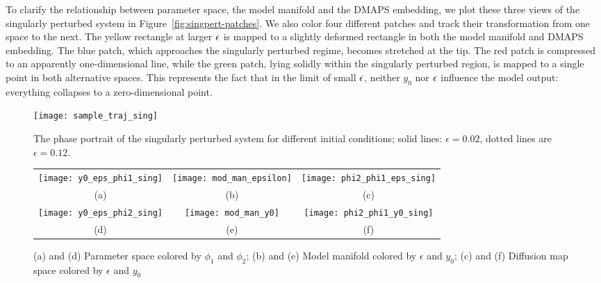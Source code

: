 To clarify the relationship between parameter space, the model
manifold and the DMAPS embedding, we plot these three views of the
singularly perturbed system in Figure~\ref{fig:singpert-patches}. We
also color four different patches and track their transformation from
one space to the next. The yellow rectangle at larger $\epsilon$ is mapped
to a slightly deformed rectangle in both the model manifold and DMAPS
embedding. The blue patch, which approaches the singularly perturbed
regime, becomes stretched at the tip. The red patch is compressed to
an apparently one-dimensional line, while the green patch, lying
solidly within the singularly perturbed region, is mapped to a single
point in both alternative spaces. This represents the fact that in the
limit of small $\epsilon$, neither $y_0$ nor $\epsilon$ influence the model
output: everything collapses to a zero-dimensional point.

\vspace{1cm}
\begin{figure}[!htp]
  \centering
  \texttt{[image: sample\_traj\_sing]}
  \caption[Phase portrait for singularly perturbed system]{The phase portrait of the singularly perturbed system for
    different initial conditions; solid lines: $\epsilon=0.02$, dotted
    lines are $\epsilon=0.12$. \label{fig:singpert}}
\end{figure}

\begin{figure}[!htp]
  \centering
  \begin{tabular}{ccc}
    \texttt{[image: y0\_eps\_phi1\_sing]} &
                                                               \texttt{[image: mod\_man\_epsilon]} &
                                                                                                                         \texttt{[image: phi2\_phi1\_eps\_sing]} \\
    (a) & (b) & (c)\\
    \texttt{[image: y0\_eps\_phi2\_sing]} &
                                                               \texttt{[image: mod\_man\_y0]} &
                                                                                                                    \texttt{[image: phi2\_phi1\_y0\_sing]}  \\
    (d) & (e) & (f)\\
  \end{tabular}
  \caption[DMAPS results for singularly perturbed system]{(a) and (d) Parameter space colored by $\phi_1$ and
    $\phi_2$; (b) and (e) Model manifold colored by $\epsilon$ and
    $y_0$; (c) and (f) Diffusion map space colored by $\epsilon$ and
    $y_0$ \label{fig:singpert-dmaps}}
\end{figure}


